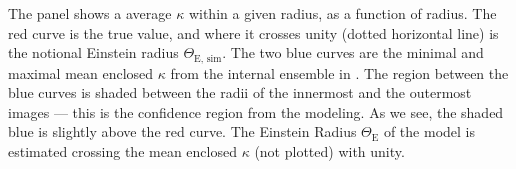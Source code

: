 The panel shows
a average $\kappa$ within a given radius, as a function of radius.
The red curve is the true value, and where it crosses unity (dotted
horizontal line) is the notional Einstein radius $\Theta_{\text{E, sim}}$.
  The two blue curves
are the minimal and maximal mean enclosed $\kappa$ from the internal
ensemble in \spl.  The region between the blue curves is shaded
between the radii of the innermost and the outermost images --- this
is the confidence region from the modeling.  As we see, the shaded
blue is slightly above the red curve. 
The Einstein Radius $\Theta_\text{E}$ of the model is estimated crossing the
mean enclosed $\kappa$ (not plotted) with unity.
